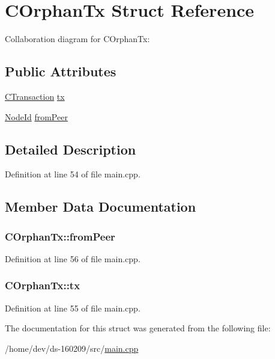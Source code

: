 \hypertarget{struct_c_orphan_tx}{}\section{C\+Orphan\+Tx Struct Reference}
\label{struct_c_orphan_tx}


Collaboration diagram for C\+Orphan\+Tx\+:
\subsection*{Public Attributes}
\begin{DoxyCompactItemize}
\item 
\hyperlink{class_c_transaction}{C\+Transaction} \hyperlink{struct_c_orphan_tx_aa797568f3a1168e96d3c51601eda5fdc}{tx}
\item 
\hyperlink{net_8h_a954d746a58632565552615fd0a4ee660}{Node\+Id} \hyperlink{struct_c_orphan_tx_a06fa313a474fd4e6d0ed20bda7cbe69c}{from\+Peer}
\end{DoxyCompactItemize}


\subsection{Detailed Description}


Definition at line 54 of file main.\+cpp.



\subsection{Member Data Documentation}
\hypertarget{struct_c_orphan_tx_a06fa313a474fd4e6d0ed20bda7cbe69c}{}
\subsubsection[{from\+Peer}]{ C\+Orphan\+Tx\+::from\+Peer}\label{struct_c_orphan_tx_a06fa313a474fd4e6d0ed20bda7cbe69c}


Definition at line 56 of file main.\+cpp.

\hypertarget{struct_c_orphan_tx_aa797568f3a1168e96d3c51601eda5fdc}{}
\subsubsection[{tx}]{ C\+Orphan\+Tx\+::tx}\label{struct_c_orphan_tx_aa797568f3a1168e96d3c51601eda5fdc}


Definition at line 55 of file main.\+cpp.



The documentation for this struct was generated from the following file\+:\begin{DoxyCompactItemize}
\item 
/home/dev/ds-\/160209/src/\hyperlink{main_8cpp}{main.\+cpp}\end{DoxyCompactItemize}
